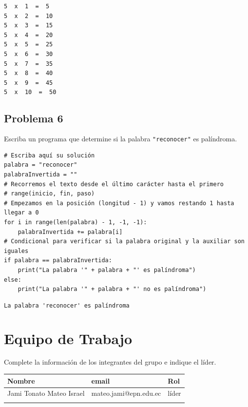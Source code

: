 \documentclass{article}
\begin{document}
\begin{verbatim}
5  x  1  =  5
5  x  2  =  10
5  x  3  =  15
5  x  4  =  20
5  x  5  =  25
5  x  6  =  30
5  x  7  =  35
5  x  8  =  40
5  x  9  =  45
5  x  10  =  50
\end{verbatim}

\subsection{Problema 6}
\label{sec:orgd7a9b8e}
Escriba un programa que determine si la palabra \texttt{"reconocer"} es palíndroma.

\begin{verbatim}
# Escriba aquí su solución
palabra = "reconocer"
palabraInvertida = ""
# Recorremos el texto desde el último carácter hasta el primero
# range(inicio, fin, paso)
# Empezamos en la posición (longitud - 1) y vamos restando 1 hasta llegar a 0
for i in range(len(palabra) - 1, -1, -1):
    palabraInvertida += palabra[i]
# Condicional para verificar si la palabra original y la auxiliar son iguales
if palabra == palabraInvertida:
    print("La palabra '" + palabra + "' es palíndroma")
else:
    print("La palabra '" + palabra + "' no es palíndroma")
\end{verbatim}

\begin{verbatim}
La palabra 'reconocer' es palíndroma
\end{verbatim}

\section{Equipo de Trabajo}
\label{sec:org1982b5b}
Complete la información de los integrantes del grupo e indique el líder.

\begin{center}
\begin{tabular}{lll}
\hline
Nombre & email & Rol\\[0pt]
\hline
Jami Tonato Mateo Israel & mateo.jami@epn.edu.ec & líder\\[0pt]
 &  & \\[0pt]
\hline
\end{tabular}
\end{center}
\end{document}
